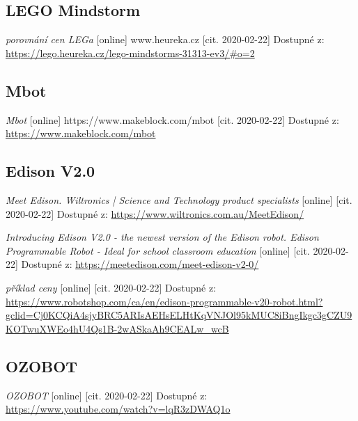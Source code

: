 \documentclass{template/socthesis}
\begin{document}
\listoffigures
{}

\listoftables
{}
\renewcommand{\refname}{Další zdroje}
\begin{thebibliography}{1}
	
	\subsection*{LEGO Mindstorm}
	
	\textit{porovnání cen LEGa} [online] www.heureka.cz [cit. 2020-02-22] Dostupné z: \\ 
	\url{https://lego.heureka.cz/lego-mindstorms-31313-ev3/#o=2}
	
	
	\subsection*{Mbot}
	\textit{Mbot} [online] https://www.makeblock.com/mbot [cit. 2020-02-22] Dostupné z: \url{https://www.makeblock.com/mbot}
	
	
	\subsection*{Edison V2.0}
	\textit{Meet Edison. Wiltronics | Science and Technology product specialists} [online] [cit. 2020-02-22] Dostupné z: \url{https://www.wiltronics.com.au/MeetEdison/}
	
	\textit{Introducing Edison V2.0 - the newest version of the Edison robot. Edison Programmable Robot - Ideal for school classroom education} [online] [cit. 2020-02-22] Dostupné z:
	\url{https://meetedison.com/meet-edison-v2-0/}
	 
	\textit{příklad ceny} [online] [cit. 2020-02-22] Dostupné z: \\ 
	\url{https://www.robotshop.com/ca/en/edison-programmable-v20-robot.html?gclid=Cj0KCQiA4sjyBRC5ARIsAEHsELHtKqVNJOl95kMUC8iBngIkgc3gCZU9KOTwuXWEo4hU4Qs1B-2wASkaAh9CEALw_wcB}
	
	\subsection*{OZOBOT}
	
	\textit{OZOBOT} [online] [cit. 2020-02-22] Dostupné z:
	\url{https://www.youtube.com/watch?v=lqR3zDWAQ1o}
	

\end{thebibliography}
\end{document}

